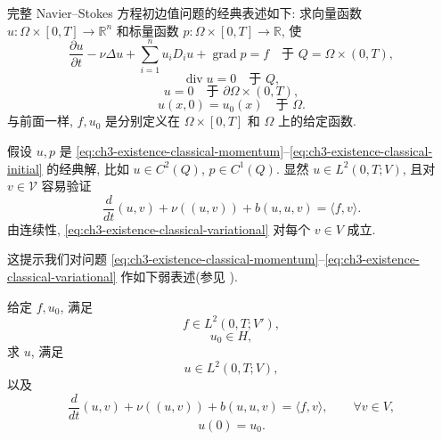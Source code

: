 \hypertarget{chapter-03-page-205}{}
完整 Navier--Stokes 方程初边值问题的经典表述如下: 求向量函数 $u:\Omega\times[0,T]\to\mathbb R^n$ 和标量函数 $p:\Omega\times[0,T]\to\mathbb R$, 使
\begin{equation}
\frac{\partial u}{\partial t}-\nu\Delta u
+\sum_{i=1}^{n}u_iD_i u+\operatorname{grad}p=f
\quad\text{于 }Q=\Omega\times(0,T),
\label{eq:ch3-existence-classical-momentum}
\end{equation}
\begin{equation}
\operatorname{div}u=0\quad\text{于 }Q,
\label{eq:ch3-existence-classical-incompressibility}
\end{equation}
\begin{equation}
u=0\quad\text{于 }\partial\Omega\times(0,T),
\label{eq:ch3-existence-classical-boundary}
\end{equation}
\begin{equation}
u(x,0)=u_0(x)\quad\text{于 }\Omega.
\label{eq:ch3-existence-classical-initial}
\end{equation}
与前面一样, $f,u_0$ 是分别定义在 $\Omega\times[0,T]$ 和 $\Omega$ 上的给定函数.

假设 $u,p$ 是 \eqref{eq:ch3-existence-classical-momentum}--\eqref{eq:ch3-existence-classical-initial} 的经典解, 比如 $u\in C^2(Q)$, $p\in C^1(Q)$. 显然 $u\in L^2(0,T;V)$, 且对 $v\in\mathcal V$ 容易验证
\begin{equation}
\frac d{dt}(u,v)+\nu((u,v))+b(u,u,v)=\langle f,v\rangle.
\label{eq:ch3-existence-classical-variational}
\end{equation}
由连续性, \eqref{eq:ch3-existence-classical-variational} 对每个 $v\in V$ 成立.

这提示我们对问题 \eqref{eq:ch3-existence-classical-momentum}--\eqref{eq:ch3-existence-classical-variational} 作如下弱表述(参见 ).

\MBProblemHeading
\label{prob:ch3-weak-variational}
给定 $f,u_0$, 满足
\begin{equation}
f\in L^2(0,T;V'),
\label{eq:ch3-existence-force-assumption}
\end{equation}
\begin{equation}
u_0\in H,
\label{eq:ch3-existence-initial-assumption}
\end{equation}
求 $u$, 满足
\begin{equation}
u\in L^2(0,T;V),
\label{eq:ch3-existence-weak-solution-space}
\end{equation}
以及
\begin{equation}
\frac d{dt}(u,v)+\nu((u,v))+b(u,u,v)=\langle f,v\rangle,
\qquad\forall v\in V,
\label{eq:ch3-existence-weak-variational-equation}
\end{equation}
\begin{equation}
u(0)=u_0.
\label{eq:ch3-existence-weak-initial-condition}
\end{equation}

